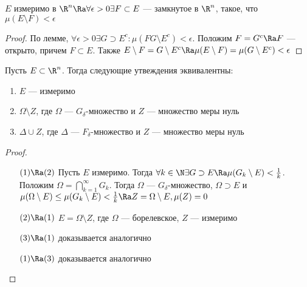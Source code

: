 
\begin{corollary}
    \(E\) измеримо в \(\R^n \Ra \forall \epsilon > 0 \exists F \subset E\) --- замкнутое в \(\R^n\), такое, что \(\mu(E \setminus F) < \epsilon\)
\end{corollary}
\begin{proof}
    По лемме, \(\forall \epsilon > 0 \exists G \supset E^c: \mu(FG \setminus E^c) < \epsilon\). Положим \(F = G^c \Ra F\) --- открыто, причем \(F \subset E\). Также \(E \setminus F = G\setminus E^c \Ra \mu(E \setminus F) = \mu(G \setminus E^c) < \epsilon\)
\end{proof}

\begin{theorem}
    Пусть \(E \subset \R^n\). Тогда следующие утвеждения эквивалентны:
    \begin{enumerate}
        \item \(E\) --- измеримо
        \item \(\Omega \setminus Z\), где \(\Omega\) --- \(G_\delta\)-множество и \(Z\) --- множество меры нуль
        \item \(\Delta \cup Z\), где \(\Delta\) --- \(F_\delta\)-множество и \(Z\) --- множество меры нуль
    \end{enumerate}
\end{theorem}
\begin{proof}\indent
    \begin{enumerate}
        \item[\((1) \Ra (2)\)] Пусть \(E\) измеримо. Тогда \(\forall k \in \N \exists G \supset E \Ra \mu(G_k \setminus E) < \frac{1}{k}\). Положим \(\Omega = \bigcap_{k = 1}^\infty G_k\). Тогда \(\Omega\) --- \(G_\delta\)-множество, \(\Omega \supset E\) и \(\mu(\Omega \setminus E) \le \mu(G_k \setminus E) < \frac{1}{k} \Ra Z = \Omega \setminus E, \mu(Z) = 0\)
        \item[\((2) \Ra (1)\)] \(E = \Omega \setminus Z\), где \(\Omega\) --- борелевское, \(Z\) --- измеримо
        \item[\((3) \Ra (1)\)] доказывается аналогично
        \item[\((1) \Ra (3)\)] доказывается аналогично
    \end{enumerate}
\end{proof}


